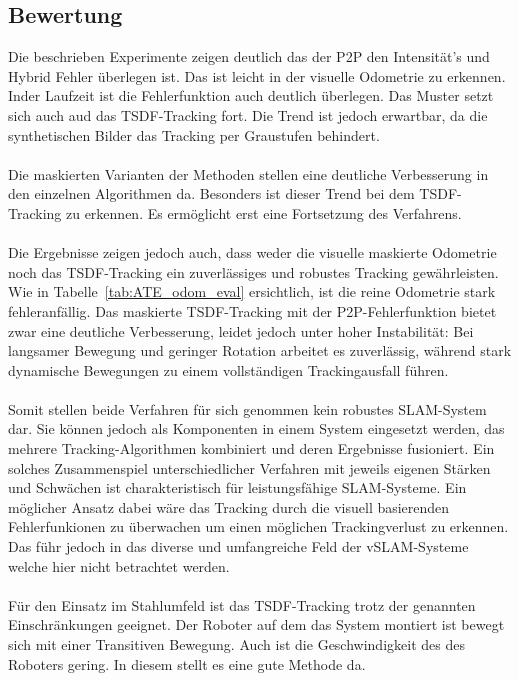 \documentclass[12pt,DIV=15,BCOR=15mm,twoside,headsepline,abstract=true,listof=totoc,bibliography=totoc]{scrreprt}
\theoremstyle{remark}    %
\begin{document}
    \subsection{Bewertung}
    Die beschrieben Experimente zeigen deutlich das der \ac{P2P} den Intensität's und Hybrid Fehler überlegen ist. Das ist leicht in der visuelle Odometrie
    zu erkennen. Inder Laufzeit ist die Fehlerfunktion auch deutlich überlegen. 
    Das Muster setzt sich auch aud das \ac{TSDF}-Tracking fort. Die Trend ist jedoch erwartbar, da die synthetischen Bilder das Tracking per Graustufen behindert.\\\\
    Die  maskierten  Varianten der Methoden stellen eine deutliche Verbesserung in den einzelnen Algorithmen da. Besonders ist dieser Trend bei dem \ac{TSDF}-Tracking
    zu erkennen. Es ermöglicht erst eine Fortsetzung des Verfahrens.\\\\
    Die Ergebnisse zeigen jedoch auch, dass weder die visuelle maskierte Odometrie noch das \ac{TSDF}-Tracking ein zuverlässiges und robustes Tracking gewährleisten.
    Wie in Tabelle~\ref{tab:ATE_odom_eval} ersichtlich, ist die reine Odometrie stark fehleranfällig.
    Das maskierte \ac{TSDF}-Tracking mit der \ac{P2P}-Fehlerfunktion bietet zwar eine deutliche Verbesserung, leidet jedoch unter hoher Instabilität:
    Bei langsamer Bewegung und geringer Rotation arbeitet es zuverlässig, während stark dynamische Bewegungen zu einem vollständigen Trackingausfall führen.\\\\ 
    Somit stellen beide Verfahren für sich genommen kein robustes \ac{SLAM}-System dar.
    Sie können jedoch als Komponenten in einem System eingesetzt werden, das mehrere Tracking-Algorithmen kombiniert und deren Ergebnisse fusioniert.
    Ein solches Zusammenspiel unterschiedlicher Verfahren mit jeweils eigenen Stärken und Schwächen ist charakteristisch für leistungsfähige \ac{SLAM}-Systeme.
    Ein möglicher Ansatz dabei wäre das Tracking durch die visuell basierenden Fehlerfunkionen zu überwachen um einen möglichen Trackingverlust zu erkennen.
    Das führ jedoch in das diverse und umfangreiche Feld der vSLAM-Systeme welche hier nicht betrachtet werden.\\\\
    Für den Einsatz im Stahlumfeld ist das \ac{TSDF}-Tracking trotz der genannten Einschränkungen geeignet. Der Roboter auf dem das System montiert ist bewegt 
    sich mit einer Transitiven Bewegung. Auch ist die Geschwindigkeit des des Roboters gering. In diesem stellt es eine gute Methode da. 
\end{document}
